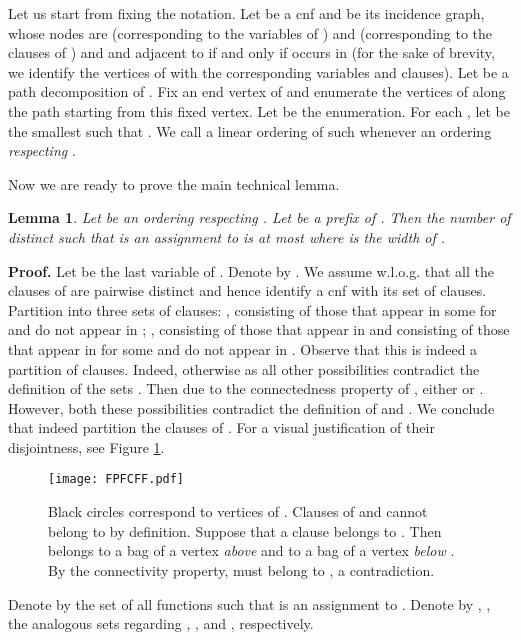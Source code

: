 \documentclass{article}
\newtheorem{lemma}{Lemma}
\begin{document}
Let us start from fixing the notation. 
Let  be a {\sc cnf} and  be its incidence graph, 
whose nodes are  (corresponding to the variables of )
and  (corresponding to the clauses of ) and  and adjacent
to  if and only if  occurs in  (for the sake of brevity, we identify 
the vertices of  with the corresponding variables and clauses). 
Let  be a path decomposition of .  Fix an end
vertex of  and enumerate the vertices of  along the path starting from
this fixed vertex. Let  be the enumeration.
For each , let  be the smallest  such that .
We call a linear ordering  of  such  whenever
 an ordering \emph{respecting} . 

Now we are ready to prove the main technical lemma.

\begin{lemma} \label{layersize}
Let  be an ordering respecting .
Let  be a prefix of . Then the number of distinct
 such that  is an assignment to  is at most
 where  is the width of .
\end{lemma} 

{\bf Proof.} 
Let  be the last variable of . Denote  by . 
We assume w.l.o.g. that all the clauses of  are pairwise distinct
and hence identify a {\sc cnf} with its set of clauses. 
Partition  into three sets of clauses: , consisting of those that 
appear in some  for  and do not appear in ; , 
consisting of those that appear in  and  consisting of those
that appear in  for some  and do not appear in .
Observe that this is indeed a partition of clauses.
Indeed, otherwise  as all other possibilities
contradict the definition of the sets . 
Then due to the connectedness property of ,
either  or .
However, both these possibilities contradict the definition of  and .
We conclude that  indeed partition the clauses of . For a visual 
justification of their disjointness, see Figure \ref{FPFCFFPic}.

\begin{figure}[h] 
\centering
\texttt{[image: FPFCFF.pdf]}
\caption{Black circles correspond to vertices  of . Clauses of 
and  cannot belong to  by definition. Suppose that a clause  belongs 
to . Then  belongs to a bag of a vertex \emph{above}  and to a bag of a vertex \emph{below} .
By the connectivity property,  must belong to , a contradiction.}
\label{FPFCFFPic}
\end{figure}

Denote by  the set of all functions  such that  is an assignment
to . Denote by , ,  the analogous sets regarding
, , and , respectively. 
\end{document}
